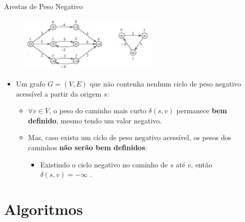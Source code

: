 \documentclass[aspectratio=169]{beamer}
\begin{document}
	
	\begin{frame}{Arestas de Peso Negativo}
		\begin{figure}[H]
			\centering
			\includegraphics[width=0.6\textwidth]{img/negativo2.jpeg}
			\label{fig:negativo}
		\end{figure}
		
		\begin{itemize}
			\item Um grafo $G = (V,E)$ que não contenha nenhum ciclo de peso negativo acessível a partir da origem $s$:
			\begin{itemize}
				\item  $\forall v \in V$, o peso do caminho mais curto $\delta(s,v)$ permanece \textbf{bem definido}, mesmo tendo um valor negativo. 
				
				\pause
				
				\item Mas, caso exista um ciclo de peso negativo acessível, os pesos dos caminhos \textbf{não serão bem definidos}:
				\begin{itemize}
					\item Existindo o ciclo negativo no caminho de $s$ até $v$, então $\delta(s,v) = - \infty$ \cite{cormen2002algoritmos}. 
				\end{itemize}
			\end{itemize}
		\end{itemize}
	\end{frame}
	
	
\section{Algoritmos}
	
\end{document}
